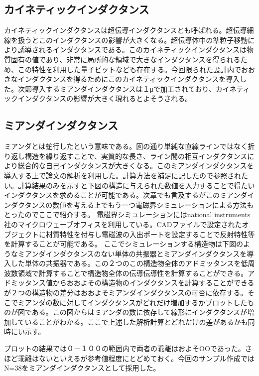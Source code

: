     \subsection{カイネティックインダクタンス}
        カイネティックインダクタンスは超伝導インダクタンスとも呼ばれる。超伝導細線を扱うとこのインダクタンスの影響が大きくなる。超伝導体中の準粒子移動により誘導されるインダクタンスである。このカイネティックインダクタンスは物質固有の値であり、非常に局所的な領域で大きなインダクタンスを得られるため、この特性を利用した量子ビットなども存在する。今回限られた設計内でおおきなインダクタンスを得るためにこのカイネティックインダクタンスを導入した。次節導入するミアンダインダクタンスは１μで加工されており、カイネティックインダクタンスの影響が大きく現れるとよそうされる。
    \subsection{ミアンダインダクタンス}
        ミアンダとは蛇行したという意味である。図の通り単純な直線ラインではなく折り返し構造を繰り返すことで、実質的な長さ、ライン間の相互インダクタンスにより総合的な自己インダクタンスが大きくなる。このミアンダインダクタンスを導入する上で論文の解析を利用した。計算方法を補足に記したので参照されたい。計算結果のみを示すと下図の構造に与えられた数値を入力することで得たいインダクタンスを求めることが可能である。次章でも言及するがこのミアンダインダクタンスの数値を考える上でもう一つ電磁界シミュレーションによる方法もとったのでここで紹介する。
        電磁界シミュレーションにはnational instruments社のマイクロウェーブオフィスを利用している。CADファイルで設定されたオブジェクトに材質特性を付与し電磁波の入出ポートを設定することで反射特性等を計算することが可能である。
        ここでシミュレーションする構造物は下図のようなミアンダインダクタンスのない単体の共振器とミアンダインダクタンスを導入した単体の共振器である。この２つのこの構造物全体のアドミッタンスを低周波数領域で計算することで構造物全体の伝導伝導性を計算することができる。アドミッタンス値からおおよその構造物のインダクタンスを計算することができるが２つの構造物の差分はおおよそミアンダインダクタンスの可否に依存する。そこでミアンダの数に対してインダクタンスがどれだけ増加するかプロットしたものが図である。この図からはミアンダの数に依存して線形にインダクタンスが増加していることがわかる。ここで上述した解析計算とどれだけの差があるかも同時にい示す。

        プロットの結果では０－１００の範囲内で両者の乖離はおよそOOであった。さほど乖離はないといえるが参考値程度にとどめておく。今回のサンプル作成ではN=38をミアンダインダクタンスとして採用した。
        
        